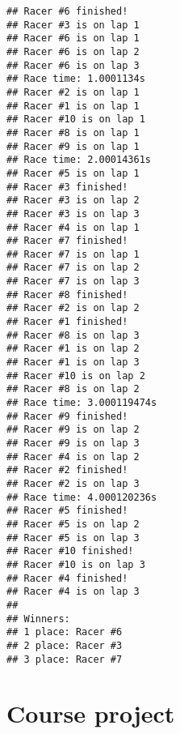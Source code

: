 \documentclass[]{book}
\begin{document}
\begin{verbatim}
## Racer #6 finished!
## Racer #3 is on lap 1
## Racer #6 is on lap 1
## Racer #6 is on lap 2
## Racer #6 is on lap 3
## Race time: 1.0001134s
## Racer #2 is on lap 1
## Racer #1 is on lap 1
## Racer #10 is on lap 1
## Racer #8 is on lap 1
## Racer #9 is on lap 1
## Race time: 2.00014361s
## Racer #5 is on lap 1
## Racer #3 finished!
## Racer #3 is on lap 2
## Racer #3 is on lap 3
## Racer #4 is on lap 1
## Racer #7 finished!
## Racer #7 is on lap 1
## Racer #7 is on lap 2
## Racer #7 is on lap 3
## Racer #8 finished!
## Racer #2 is on lap 2
## Racer #1 finished!
## Racer #8 is on lap 3
## Racer #1 is on lap 2
## Racer #1 is on lap 3
## Racer #10 is on lap 2
## Racer #8 is on lap 2
## Race time: 3.000119474s
## Racer #9 finished!
## Racer #9 is on lap 2
## Racer #9 is on lap 3
## Racer #4 is on lap 2
## Racer #2 finished!
## Racer #2 is on lap 3
## Race time: 4.000120236s
## Racer #5 finished!
## Racer #5 is on lap 2
## Racer #5 is on lap 3
## Racer #10 finished!
## Racer #10 is on lap 3
## Racer #4 finished!
## Racer #4 is on lap 3
## 
## Winners:
## 1 place: Racer #6
## 2 place: Racer #3
## 3 place: Racer #7
\end{verbatim}

\hypertarget{course-project}{%
\chapter*{Course project}\label{course-project}}
\end{document}
